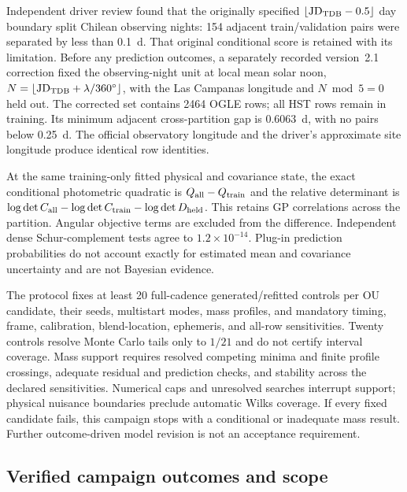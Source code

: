 Independent driver review found that the originally specified
$\lfloor\mathrm{JD}_{\rm TDB}-0.5\rfloor$ day boundary split Chilean observing
nights: 154 adjacent train/validation pairs were separated by less than 0.1~d.
That original conditional score is retained with its limitation. Before any
prediction outcomes, a separately recorded version~2.1 correction fixed the
observing-night unit at local mean solar noon,
$N=\lfloor\mathrm{JD}_{\rm TDB}+\lambda/360^\circ\rfloor$, with the Las Campanas
longitude and $N\bmod5=0$ held out. The corrected set contains 2464 OGLE rows;
all HST rows remain in training. Its minimum adjacent cross-partition gap is
$0.6063$~d, with no pairs below 0.25~d. The official observatory longitude and the
driver's approximate site longitude produce identical row identities.

At the same training-only fitted physical and covariance state, the exact
conditional photometric quadratic is $Q_{\rm all}-Q_{\rm train}$ and the relative
determinant is
$\log\det C_{\rm all}-\log\det C_{\rm train}-\log\det D_{\rm held}$.
This retains GP correlations across the partition. Angular objective terms are
excluded from the difference. Independent dense Schur-complement tests agree to
$1.2\times10^{-14}$. Plug-in prediction probabilities do not account exactly for
estimated mean and covariance uncertainty and are not Bayesian evidence.

The protocol fixes at least 20 full-cadence generated/refitted controls per OU
candidate, their seeds, multistart modes, mass profiles, and mandatory timing,
frame, calibration, blend-location, ephemeris, and all-row sensitivities. Twenty
controls resolve Monte Carlo tails only to $1/21$ and do not certify interval
coverage. Mass support requires resolved competing minima and finite profile
crossings, adequate residual and prediction checks, and stability across the
declared sensitivities. Numerical caps and unresolved searches interrupt support;
physical nuisance boundaries preclude automatic Wilks coverage. If every fixed
candidate fails, this campaign stops with a conditional or inadequate mass result.
Further outcome-driven model revision is not an acceptance requirement.

\subsection{Verified campaign outcomes and scope}

